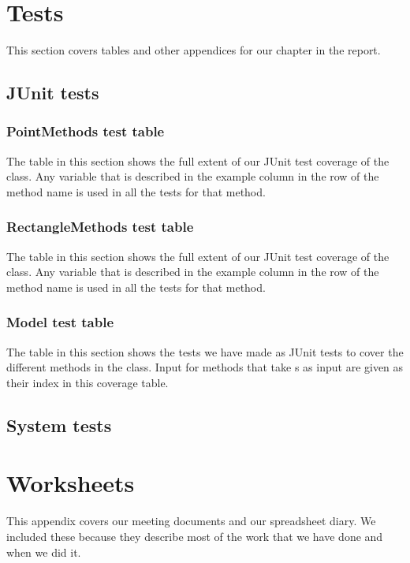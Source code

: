 \appendix
\addappheadtotoc
\chapter{Tests}
This section covers tables and other appendices for our  chapter in
the report.
\section{JUnit tests}
\label{APP-TE-JU}
\subsection{PointMethods test table}
\label{APP-TE-JU-PM}
The table in this section shows the full extent of our JUnit test coverage of
the  class. Any variable that is described in the
example column in the row of the method name is used in all the tests for that
method.


\subsection{RectangleMethods test table}
\label{APP-TE-JU-RM}
The table in this section shows the full extent of our JUnit test coverage of
the  class. Any variable that is described in the
example column in the row of the method name is used in all the tests for that
method.


\subsection{Model test table}
\label{APP-TE-JU-MO}
The table in this section shows the tests we have made as JUnit tests to cover
the different methods in the  class. Input for methods that take
s as input are given as their index in this coverage table.



\pagebreak
\section{System tests}
\label{APP-TE-ST}



\chapter{Worksheets}
\label{APP-WS}
This appendix covers our meeting documents and our spreadsheet diary. We
included these because they describe most of the work that we have done and when
we did it.

